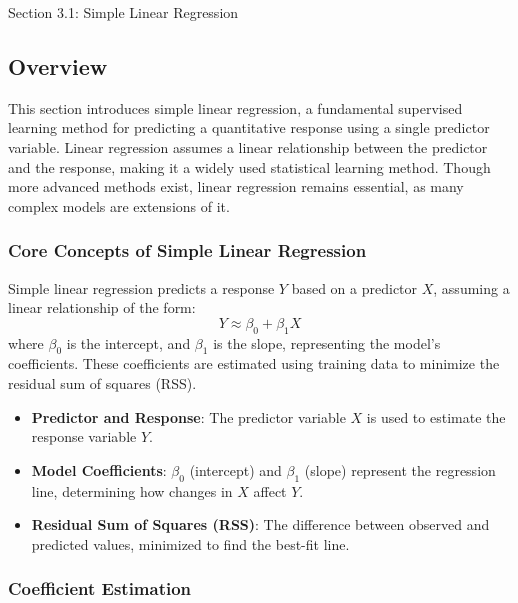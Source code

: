 \begin{notes}{Section 3.1: Simple Linear Regression}
    \subsection*{Overview}

    This section introduces simple linear regression, a fundamental supervised learning method for predicting a quantitative response using a single predictor variable. Linear regression assumes a 
    linear relationship between the predictor and the response, making it a widely used statistical learning method. Though more advanced methods exist, linear regression remains essential, as many 
    complex models are extensions of it.
    
    \subsubsection*{Core Concepts of Simple Linear Regression}
    
    Simple linear regression predicts a response $Y$ based on a predictor $X$, assuming a linear relationship of the form:
    \[
    Y \approx \beta_0 + \beta_1 X
    \]
    where $\beta_0$ is the intercept, and $\beta_1$ is the slope, representing the model’s coefficients. These coefficients are estimated using training data to minimize the residual sum of squares (RSS).
    
    \begin{highlight}
        \begin{itemize}
            \item \textbf{Predictor and Response}: The predictor variable $X$ is used to estimate the response variable $Y$.
            \item \textbf{Model Coefficients}: $\beta_0$ (intercept) and $\beta_1$ (slope) represent the regression line, determining how changes in $X$ affect $Y$.
            \item \textbf{Residual Sum of Squares (RSS)}: The difference between observed and predicted values, minimized to find the best-fit line.
        \end{itemize}
    \end{highlight}
    
    \subsubsection*{Coefficient Estimation}
    

\end{notes}
